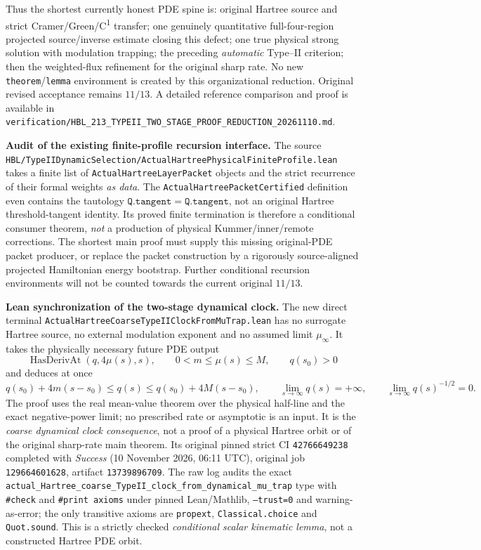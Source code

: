 \documentclass[11pt]{amsart}
\begin{document}
Thus the shortest currently honest PDE spine is:
original Hartree source and strict Cramer/Green/C\textsuperscript{1}
transfer; one genuinely quantitative full-four-region projected
source/inverse estimate closing this defect; one true physical
strong solution with modulation trapping; the preceding
\emph{automatic} Type--II criterion; then the weighted-flux
refinement for the original sharp rate.
No new \texttt{theorem}/\texttt{lemma} environment is created
by this organizational reduction. Original revised acceptance
remains \(11/13\). A detailed reference comparison and proof
is available in
\texttt{verification/HBL\_213\_TYPEII\_TWO\_STAGE\_PROOF\_REDUCTION\_20261110.md}.


\medskip
\noindent\textbf{Audit of the existing finite-profile recursion interface.}
The source
\texttt{HBL/TypeIIDynamicSelection/ActualHartreePhysicalFiniteProfile.lean}
takes a finite list of \texttt{ActualHartreeLayerPacket} objects
and the strict recurrence of their formal weights \emph{as data}.
The \texttt{ActualHartreePacketCertified} definition even
contains the tautology
\(\mathtt{Q.tangent=Q.tangent}\), not an original Hartree
threshold-tangent identity. Its proved finite termination is
therefore a conditional consumer theorem, \emph{not} a
production of physical Kummer/inner/remote corrections.
The shortest main proof must supply this missing original-PDE
packet producer, or replace the packet construction by
a rigorously source-aligned projected Hamiltonian energy
bootstrap. Further conditional recursion environments will
not be counted towards the current original \(11/13\).


\medskip
\noindent\textbf{Lean synchronization of the two-stage dynamical clock.}
The new direct terminal
\texttt{ActualHartreeCoarseTypeIIClockFromMuTrap.lean}
has no surrogate Hartree source, no external modulation exponent and
no assumed limit \(\mu_\infty\). It takes the physically necessary
future PDE output
\[
 \operatorname{HasDerivAt}(q,4\mu(s),s),\qquad
 0<m\le\mu(s)\le M,\qquad q(s_0)>0
\]
and deduces at once
\[
 q(s_0)+4m(s-s_0)\le q(s)\le
 q(s_0)+4M(s-s_0),\qquad
 \lim_{s\to\infty}q(s)=+\infty,\qquad
 \lim_{s\to\infty}q(s)^{-1/2}=0.
\]
The proof uses the real mean-value theorem over the physical
half-line and the exact negative-power limit; no prescribed rate
or asymptotic is an input. It is the
\emph{coarse dynamical clock consequence}, not a proof of a
physical Hartree orbit or of the original sharp-rate main
theorem. Its original pinned strict CI \texttt{42766649238} completed
with \emph{Success} (10 November 2026, 06:11 UTC), original
job \texttt{129664601628}, artifact \texttt{13739896709}.
The raw log audits the exact
\texttt{actual\_Hartree\_coarse\_TypeII\_clock\_from\_dynamical\_mu\_trap}
type with \texttt{\#check} and \texttt{\#print axioms}
under pinned Lean/Mathlib, \texttt{--trust=0} and
warning-as-error; the only transitive axioms are
\texttt{propext}, \texttt{Classical.choice} and
\texttt{Quot.sound}. This is a strictly checked
\emph{conditional scalar kinematic lemma}, not a
constructed Hartree PDE orbit.
\end{document}

